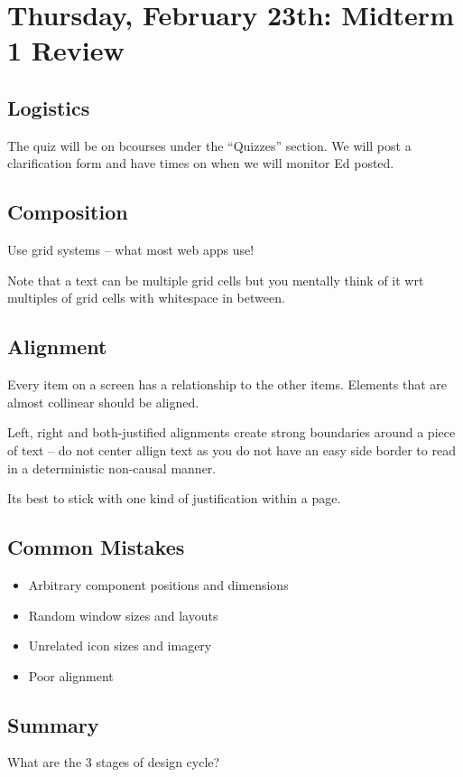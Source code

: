 \section{Thursday, February 23th: Midterm 1 Review}
\subsection{Logistics}
The quiz will be on bcourses under the ``Quizzes'' section. We will post a clarification form and have times on when we will monitor Ed posted.

\subsection{Composition}
Use grid systems -- what most web apps use!

Note that a text can be multiple grid cells but you mentally think of it wrt multiples of grid cells with whitespace in between.

\subsection{Alignment}
Every item on a screen has a relationship to the 
other items. Elements that are almost collinear 
should be aligned. 

Left, right and both-justified alignments create strong 
boundaries around a piece of text -- do not center allign text as you do not have an easy side border to read in a deterministic non-causal manner. 

Its best to stick with one kind of justification within 
a page.

\subsection{Common Mistakes}
\begin{important}
\begin{itemize}
    \item Arbitrary component positions and dimensions
    \item Random window sizes and layouts
    \item Unrelated icon sizes and imagery
    \item Poor alignment
\end{itemize}
\end{important}

\subsection{Summary}
What are the 3 stages of design cycle?

